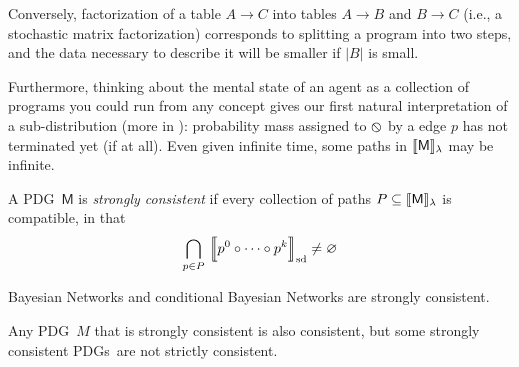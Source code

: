 \documentclass{article}
\newcommand\SD{_{\text{sd}}}
\newcommand{\none}{\varobslash}
\newcommand{\sfM}{\mathsf M}
\newcommand{\MN}{PDG}
\newcommand{\MNs}{\MN s}
\numberwithin{equation}{section}
\begin{document}
\begin{vfull}
\begin{example}
		Conversely, factorization of a table $A \to C$ into tables $A \to B$ and $B \to C$ (i.e., a stochastic matrix factorization) corresponds to splitting a program into two steps, and the data necessary to describe it will be smaller if $|B|$ is small.
	\end{example}	
	
	
	Furthermore, thinking about the mental state of an agent as a collection of programs you could run from any concept gives our first natural interpretation of a sub-distribution (more in ): probability mass assigned to $\none$ by a edge $p$ has not terminated yet (if at all). 
	Even given infinite time, some paths in $\bbr{\sfM}_\lambda$ may be infinite.
	
	\begin{defn}
		A \MN\ $\sfM$ is \emph{strongly consistent} if every collection of paths $P \subseteq \bbr{\sfM}_\lambda$ is compatible, in that 
		$$\bigcap_{p \in P}\ \bbr*{\vphantom{\Big|}p^0\circ \cdots\circ p^k}\SD \neq \varnothing$$
	\end{defn}

	\begin{example}
		Bayesian Networks and conditional Bayesian Networks are strongly consistent.
	\end{example}

	\begin{prop}
		Any \MN\ $M$ that is strongly consistent is also consistent, but some strongly consistent \MNs\ are not strictly consistent.
	\end{prop}




	\end{vfull}
	
	


\end{document}
